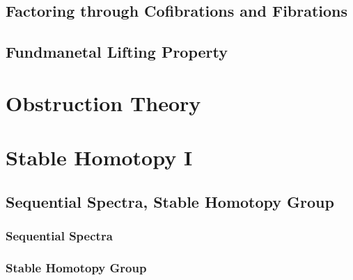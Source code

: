\documentclass[Total.tex]{subfiles}
\begin{document}
		\section{Factoring through Cofibrations and Fibrations}
		\section{Fundmanetal Lifting Property} 
	\chapter{Obstruction Theory}
	\chapter{Stable Homotopy I}
		\section{Sequential Spectra, Stable Homotopy Group}	
			\subsection{Sequential Spectra}
			
			\subsection{Stable Homotopy Group}
\end{document}
